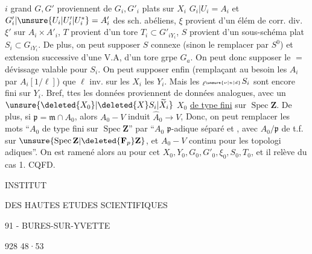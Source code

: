  $i$ grand $G,G'$ proviennent de $G_i,G'_i$  plats sur $X_i$
$G_i|U_i=A_i$ et $G'_i|\unsure{U_i|U_i'|U_i^*}=A'_i$ des sch. abéliens,
$\xi$ provient d'un élém de corr. div. $\xi'$ sur $A_i\times A'_i$,
$T$ provient d'un tore $T_i\subset G'_{iY_i}$, $S$ provient d'un sous-schéma plat $S_i\subset G_{iY_i}$.
De plus,   on peut  supposer $S$ connexe  (sinon le remplacer par $S^0$) et
extension  successive d'une V.A, d'un tore     grpe $G_a$.
On peut donc supposer le $=$ dévissage valable pour $S_i$.
On peut supposer enfin (remplaçant au besoin les $A_i$ par  $A_i[1/\ell]$) que $\ell$ inv. sur les $X_i$  les $Y_i$.
Mais les $ {}_{\ell^{\unsure{\nu|n|d}}}S_i$ sont encore fini sur $Y_i$.
Bref, ttes les données proviennent de  données analogues, avec un $\unsure{\deleted{X_0}|\deleted{X}S_i|\widetilde X_i}$
$X_0$  \uline{de type fini} sur $\operatorname{Spec}\mathbf Z$.
De plus, si $\mathfrak p=\mathfrak m\cap A_0$, alors $A_0\mathbin{-}V$ induit $\widehat A_0\longrightarrow V$, 
Donc, on peut remplacer les mots ``$A_0$ de type fini sur $\operatorname{Spec}\mathbf Z$'' par ``$A_0$ $\mathfrak p$-adique séparé et , avec $A_0/\mathfrak p$ de t.f. sur $\unsure{\operatorname{Spec}\mathbf Z|\deleted{\mathbf F_p}\mathbf Z}$, et $A_0\mathbin{-}V$ continu pour les topologi adiques''.
On est ramené alors au  pour cet $X_0,Y_0,G_0,G'_0,\xi_0,S_0,T_0$, et il relève du cas 1.
\hfill CQFD.

INSTITUT

DES HAUTES ETUDES SCIENTIFIQUES

91 - BURES-SUR-YVETTE

928 48·53

